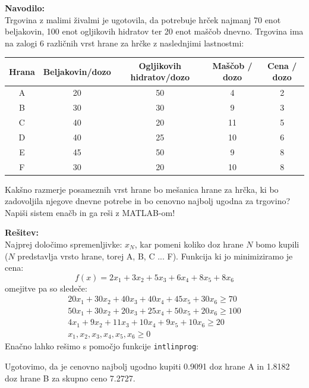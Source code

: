 \documentclass[a4paper,11pt]{article}
\begin{document}
\textbf{Navodilo:} \\
Trgovina z malimi živalmi je ugotovila, da potrebuje hrček najmanj 70 enot beljakovin, 100 enot ogljikovih hidratov ter 20 enot maščob dnevno. Trgovina ima na zalogi 6 različnih vrst hrane za hrčke z naslednjimi lastnostmi:
\begin{table}[h]
	\centering
	\begin{tabular}{| c | c | c | c | c |}
		\hline
		Hrana & Beljakovin/dozo & Ogljikovih hidratov/dozo & Maščob / dozo & Cena / dozo \\ \hline
		A & 20 & 50 & 4 & 2 \\ \hline
		B & 30 & 30 & 9 & 3 \\ \hline
		C & 40 & 20 & 11 & 5 \\ \hline
		D & 40 & 25 & 10 & 6 \\ \hline
		E & 45  & 50 & 9 & 8 \\ \hline
		F & 30 & 20 & 10 & 8 \\ \hline
	\end{tabular}
\end{table}
Kakšno razmerje posameznih vrst hrane bo mešanica hrane za hrčka, ki bo zadovoljila njegove dnevne potrebe in bo cenovno najbolj ugodna za trgovino? Napiši sistem enačb in ga reši z MATLAB-om!

\textbf{Rešitev:} \\
Najprej določimo spremenljivke: $x_N$, kar pomeni koliko doz hrane $N$ bomo kupili ($N$ predstavlja vrsto hrane, torej A, B, C ... F). Funkcija ki jo minimiziramo je cena:
\begin{equation} \label{eq:junij2008_5}
f(x) = 2x_1 + 3x_2 + 5x_3 + 6x_4 + 8x_5 + 8x_6
\end{equation}
omejitve pa so sledeče:
\begin{equation}
	\begin{gathered}
		20x_1 + 30x_2 + 40x_3 + 40x_4 + 45x_5 + 30x_6 \geq 70 \\
		50x_1 + 30x_2 + 20x_3 + 25x_4 + 50x_5 + 20x_6 \geq 100 \\
		4x_1 + 9x_2 + 11x_3 + 10x_4 + 9x_5 +  10x_6 \geq 20 \\
		x_1, x_2, x_3, x_4, x_5, x_6  \geq 0
	\end{gathered}
\end{equation}
Enačno lahko rešimo s pomočjo funkcije  \texttt{intlinprog}:

Ugotovimo, da je cenovno najbolj ugodno kupiti 0.9091 doz hrane A in 1.8182 doz hrane B za skupno ceno 7.2727.
\end{document}
